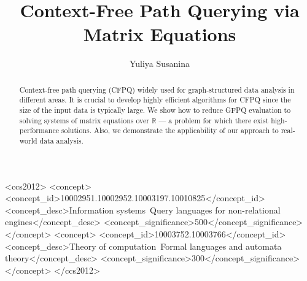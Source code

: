 \documentclass[sigconf, 10pt]{acmart}
\begin{document}
\fancyhead{}

\title{Context-Free Path Querying via Matrix Equations}

\author{Yuliya Susanina}





\begin{abstract}
  Context-free path querying (CFPQ) widely used for graph-structured data analysis in different areas.
  It is crucial to develop highly efficient algorithms for CFPQ since the size of the input data is typically large.
  We show how to reduce GFPQ evaluation to solving systems of matrix equations over $\mathbb{R}$ --- a problem for which there exist high-performance solutions.
  Also, we demonstrate the applicability of our approach to real-world data analysis.
\end{abstract}

\begin{CCSXML}
<ccs2012>
<concept>
<concept_id>10002951.10002952.10003197.10010825</concept_id>
<concept_desc>Information systems~Query languages for non-relational engines</concept_desc>
<concept_significance>500</concept_significance>
</concept>
<concept>
<concept_id>10003752.10003766</concept_id>
<concept_desc>Theory of computation~Formal languages and automata theory</concept_desc>
<concept_significance>300</concept_significance>
</concept>
</ccs2012>
\end{CCSXML}
\end{document}
